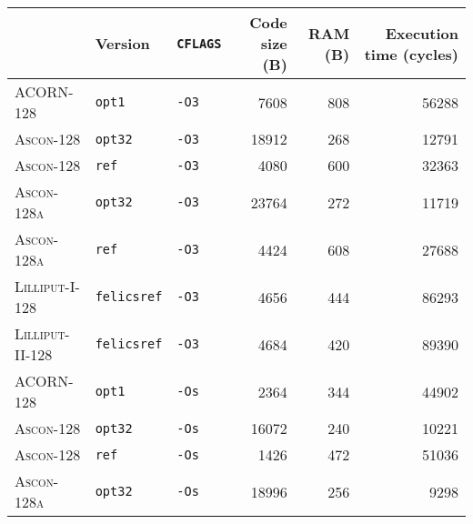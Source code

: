 \begin{table}[H]
  \centering
  \begin{tabular}{l|l|l||r|r|r}
      \textbf{}                & \textbf{Version}   & \textbf{\texttt{CFLAGS}} & \textbf{Code size (B)} & \textbf{RAM (B)} & \textbf{Execution time (cycles)} \\ \hline
      \textsc{ACORN-128}       & \texttt{opt1}      & \texttt{-O3}             &                   7608 &              808 &                            56288 \\ \hline
      \textsc{Ascon-128}       & \texttt{opt32}     & \texttt{-O3}             &                  18912 &              268 &                            12791 \\ \hline
      \textsc{Ascon-128}       & \texttt{ref}       & \texttt{-O3}             &                   4080 &              600 &                            32363 \\ \hline
      \textsc{Ascon-128a}      & \texttt{opt32}     & \texttt{-O3}             &                  23764 &              272 &                            11719 \\ \hline
      \textsc{Ascon-128a}      & \texttt{ref}       & \texttt{-O3}             &                   4424 &              608 &                            27688 \\ \hline
      \textsc{Lilliput-I-128}  & \texttt{felicsref} & \texttt{-O3}             &                   4656 &              444 &                            86293 \\ \hline
      \textsc{Lilliput-II-128} & \texttt{felicsref} & \texttt{-O3}             &                   4684 &              420 &                            89390 \\ \hline
      \textsc{ACORN-128}       & \texttt{opt1}      & \texttt{-Os}             &                   2364 &              344 &                            44902 \\ \hline
      \textsc{Ascon-128}       & \texttt{opt32}     & \texttt{-Os}             &                  16072 &              240 &                            10221 \\ \hline
      \textsc{Ascon-128}       & \texttt{ref}       & \texttt{-Os}             &                   1426 &              472 &                            51036 \\ \hline
      \textsc{Ascon-128a}      & \texttt{opt32}     & \texttt{-Os}             &                  18996 &              256 &                             9298 \\ \hline

\end{tabular}
\end{table}
